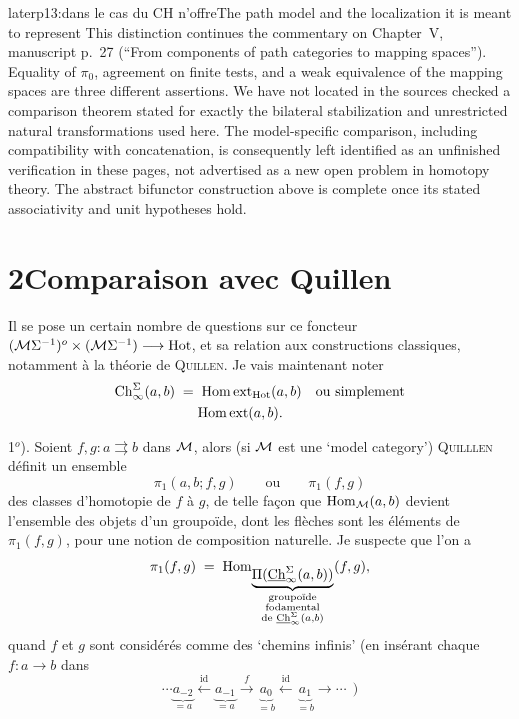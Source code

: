 \begin{dcomment}{later}{p13:dans le cas du CH n'offre}{The path model and the localization it is meant to represent}
This distinction continues the commentary on Chapter~V, manuscript p.~27 (``From components of path categories to mapping spaces''). Equality of $\pi_0$, agreement on finite tests, and a weak equivalence of the mapping spaces are three different assertions. We have not located in the sources checked a comparison theorem stated for exactly the bilateral stabilization and unrestricted natural transformations used here. The model-specific comparison, including compatibility with concatenation, is consequently left identified as an unfinished verification in these pages, not advertised as a new open problem in homotopy theory. The abstract bifunctor construction above is complete once its stated associativity and unit hypotheses hold.
\end{dcomment}




\section*{2\quad Comparaison avec Quillen}

Il se pose un certain nombre de questions sur ce foncteur $(\mathcal{M}\Sigma^{-1})^o \times (\mathcal{M}\Sigma^{-1}) \longrightarrow \mathrm{Hot}$, et sa relation aux constructions classiques, notamment à la théorie de \textsc{Quillen}. Je vais maintenant noter
\[
\begin{aligned}
\mathrm{Ch}^{\Sigma}_{\infty}(a,b) \;&=\; \mathrm{Hom\,ext}_{\mathrm{Hot}}(a,b) && \text{ou simplement}\\
&\phantom{\;=\;} \mathrm{Hom\,ext}(a,b).
\end{aligned}
\]

1$^o$). Soient $f,g : a \rightrightarrows b$ dans $\mathcal{M}$, alors (si $\mathcal{M}$ est une `model category') \textsc{Quilllen} définit un ensemble %
\[
\pi_1(a,b;f,g) \qquad \text{ou} \qquad \pi_1(f,g)
\]
des classes d'homotopie de $f$ à $g$, de telle façon que $\mathrm{Hom}_{\mathcal{M}}(a,b)$ devient l'ensemble des objets d'un groupoïde, dont les flèches sont les éléments de $\pi_1(f,g)$, pour une notion de composition naturelle. Je suspecte que l'on a
\[
\pi_1(f,g) \;=\; \mathrm{Hom}_{\underbrace{\Pi(\uCh^{\Sigma}_{\infty}(a,b))}_{\substack{\text{groupoïde}\\ \text{fodamental}\\ \text{de } \uCh^{\Sigma}_{\infty}(a,b)}}}(f,g), %
\]
quand $f$ et $g$ sont considérés comme des `chemins infinis' (en insérant chaque $f : a \longrightarrow b$ dans
\[
\cdots \underbrace{a_{-2}}_{=a} \xleftarrow{\ \mathrm{id}\ } \underbrace{a_{-1}}_{=a} \xrightarrow{\ f\ } \underbrace{a_{0}}_{=b} \xleftarrow{\ \mathrm{id}\ } \underbrace{a_{1}}_{=b} \longrightarrow \cdots\ \ )
\]

